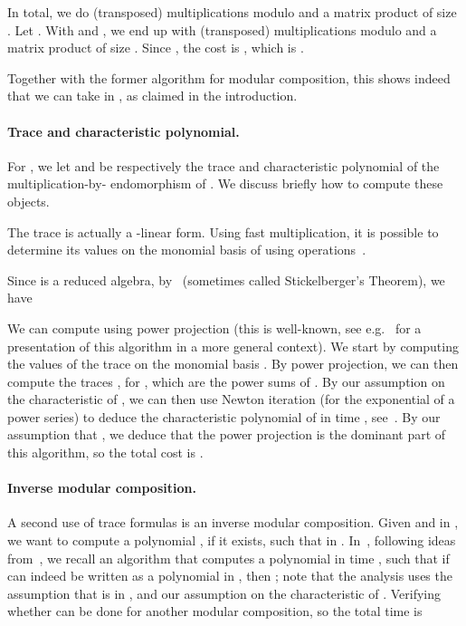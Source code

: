 \documentclass[12pt]{article}
\begin{document}
In total, we do  (transposed) multiplications modulo  and a matrix product of size . Let . With  and , we end up with 
(transposed) multiplications modulo  and a matrix
product of size . Since , the cost is
, which
is .

Together with the former algorithm for modular composition, this shows
indeed that we can take  in , as claimed
in the introduction.

\paragraph{Trace and characteristic polynomial.}
For , we let  and  be
respectively the trace and characteristic polynomial of the
multiplication-by- endomorphism of . We discuss briefly how
to compute these objects.

The trace  is actually a -linear form. Using
fast multiplication, it is possible to determine its values on the
monomial basis  of  using 
operations~\cite{PaSc06}.

Since  is a reduced algebra, by~\cite[Prop.~4.2.7]{CoLiSh98}
(sometimes called Stickelberger's Theorem), we have

We can compute  using power projection (this is well-known,
see e.g.~\cite{Rouillier99} for a presentation of this algorithm in a
more general context). We start by computing the values of the trace
 on the monomial basis . By power projection, we can then
compute the traces , for , which
are the power sums of . By our assumption on the
characteristic of , we can then use Newton iteration (for the
exponential of a power series) to deduce the characteristic polynomial
 of  in time ,
see~\cite{BrKu78,Schonhage82}. By our assumption that , we deduce that the power projection is the dominant part
of this algorithm, so the total cost is .

\paragraph{Inverse modular composition.}
A second use of trace formulas is an inverse modular
composition. Given  and  in , we want to compute a
polynomial , if it exists, such that  in
. In~\cite{PoSc10}, following ideas
from~\cite{Shoup94,Rouillier99}, we recall an algorithm that computes
a polynomial  in time , such that if  can
indeed be written as a polynomial in , then ; note that the
analysis uses the assumption that  is in ,
and our assumption on the characteristic of . Verifying whether
 can be done for another modular composition, so the total
time is 
\end{document}

